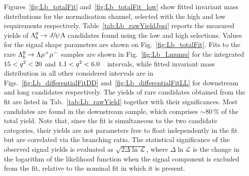 %
Figures~\ref{fig:Lb_totalFit} and~\ref{fig:Lb_totalFit_low} show fitted invariant mass distributions for
the normalisation channel, selected with the high \qsq and low \qsq requirements respectively.
Table~\ref{tab:Lb_rawYieldJpsi} reports the measured yields of $\Lb\ra\jpsi\Lz$ candidates found using the low 
and high \qsq selections. Values for the signal shape parameters are shown on Fig.~\ref{fig:Lb_totalFit}.
Fits to the rare $\Lambda^0_b\rightarrow\Lambda\mu^+\mu^-$ samples are shown in Fig.~\ref{fig:Lb_Lmumu} for the integrated
$15 < q^2 < 20$ and $1.1 < q^2 < 6.0$~\gevgevcccc ~\qsq intervals, while
fitted invariant mass distribution in all other considered \qsq intervals are in Figs.~\ref{fig:Lb_differentialFitDD}
and~\ref{fig:Lb_differentialFitLL} for downstream and long candidates respectively.
The yields of rare candidates obtained from the fit are listed in Tab.~\ref{tab:Lb_rawYield} together with their significances.
Most candidates are found in the downstream sample, which comprises $\sim 80\,\%$ of the total yield.
Note that, since the fit is simultaneous to the two candidate categories, their yields
are not parameters free to float independently in the fit but are correlated via the branching ratio.
The statistical significance of the observed signal yields is evaluated as $\sqrt{2\Delta\ln{\mathcal{L}}}$, where
$\Delta\ln{\mathcal{L}}$ is the change in the logarithm of the likelihood function when the signal component
is excluded from the fit, relative to the nominal fit in which it is present.

\begin{table}
\centering
\caption{Number of \decay{\Lb}{\jpsi\Lz} candidates in the long and
  downstream categories found using the for low- and
  high-\qsq requirements. Uncertainties shown are statistical only.}
\label{tab:Lb_rawYieldJpsi}
\end{table}

